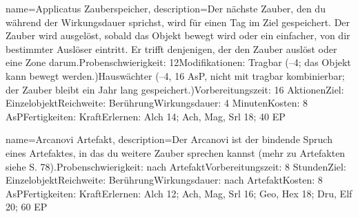 {
    name={Applicatus Zauberspeicher},
    description={Der nächste Zauber, den du während der Wirkungsdauer sprichst, wird für einen Tag im Ziel gespeichert. Der Zauber wird ausgelöst, sobald das Objekt bewegt wird oder ein einfacher, von dir bestimmter Auslöser eintritt. Er trifft denjenigen, der den Zauber auslöst oder eine Zone darum.\newline Probenschwierigkeit: 12\newline Modifikationen: Tragbar (–4; das Objekt kann bewegt werden.)\newline Hauswächter (–4, 16 AsP, nicht mit tragbar kombinierbar; der Zauber bleibt ein Jahr lang gespeichert.)\newline Vorbereitungszeit: 16 Aktionen\newline Ziel: Einzelobjekt\newline Reichweite: Berührung\newline Wirkungsdauer: 4 Minuten\newline Kosten: 8 AsP\newline Fertigkeiten: Kraft\newline Erlernen: Alch 14; Ach, Mag, Srl 18; 40 EP}
}


{
    name={Arcanovi Artefakt},
    description={Der Arcanovi ist der bindende Spruch eines Artefaktes, in das du weitere Zauber sprechen kannst (mehr zu Artefakten siehe S. 78).\newline Probenschwierigkeit: nach Artefakt\newline Vorbereitungszeit: 8 Stunden\newline Ziel: Einzelobjekt\newline Reichweite: Berührung\newline Wirkungsdauer: nach Artefakt\newline Kosten: 8 AsP\newline Fertigkeiten: Kraft\newline Erlernen: Alch 12; Ach, Mag, Srl 16; Geo, Hex 18; Dru, Elf 20; 60 EP}
}


